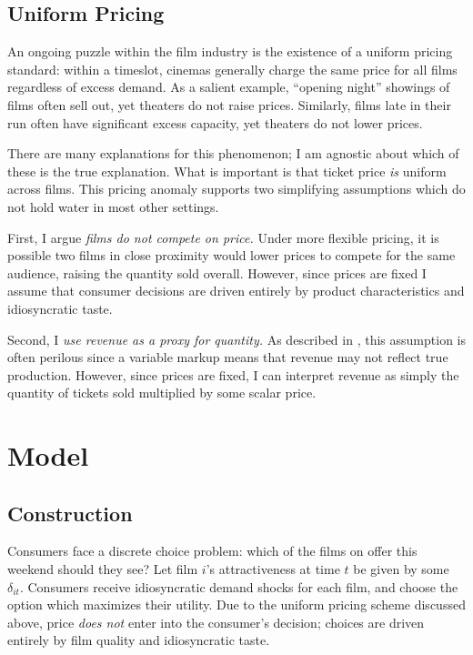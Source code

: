\documentclass{article}
\begin{document}
\subsection{Uniform Pricing}

An ongoing puzzle within the film industry is the existence of a uniform pricing standard: within a timeslot, cinemas generally charge the same price for all films regardless of excess demand. As a salient example, ``opening night'' showings of films often sell out, yet theaters do not raise prices. Similarly, films late in their run often have significant excess capacity, yet theaters do not lower prices.

There are many explanations for this phenomenon; I am agnostic about which of these is the true explanation. What is important is that ticket price \emph{is} uniform across films. This pricing anomaly supports two simplifying assumptions which do not hold water in most other settings.

First, I argue \emph{films do not compete on price.} Under more flexible pricing, it is possible two films in close proximity would lower prices to compete for the same audience, raising the quantity sold overall. However, since prices are fixed I assume that consumer decisions are driven entirely by product characteristics and idiosyncratic taste.

Second, I \emph{use revenue as a proxy for quantity.} As described in \textcite{bond2021JME}, this assumption is often perilous since a variable markup means that revenue may not reflect true production. However, since prices are fixed, I can interpret revenue as simply the quantity of tickets sold multiplied by some scalar price. 


\section{Model}

\subsection{Construction}

\label{sec:model_construction}

Consumers face a discrete choice problem: which of the films on offer this weekend should they see? Let film $i$'s attractiveness at time $t$ be given by some $\delta_{it}$. Consumers receive idiosyncratic demand shocks for each film, and choose the option which maximizes their utility. Due to the uniform pricing scheme discussed above, price \emph{does not} enter into the consumer's decision; choices are driven entirely by film quality and idiosyncratic taste.
\end{document}
